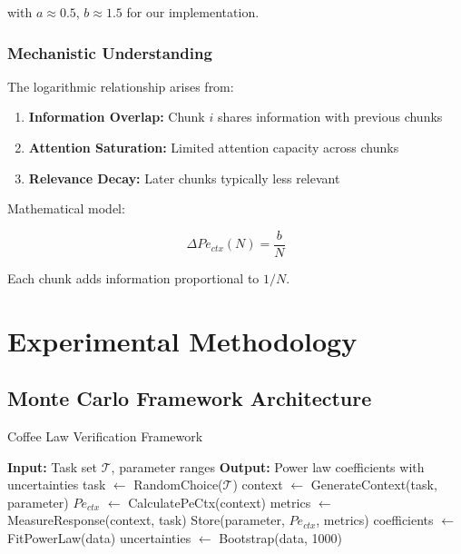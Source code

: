\documentclass[conference]{IEEEtran}
\begin{document}
with $a \approx 0.5$, $b \approx 1.5$ for our implementation.

\subsubsection{Mechanistic Understanding}

The logarithmic relationship arises from:
\begin{enumerate}
\item \textbf{Information Overlap:} Chunk $i$ shares information with previous chunks
\item \textbf{Attention Saturation:} Limited attention capacity across chunks
\item \textbf{Relevance Decay:} Later chunks typically less relevant
\end{enumerate}

Mathematical model:

\begin{equation}
\Delta Pe_{ctx}(N) = \frac{b}{N}
\end{equation}

Each chunk adds information proportional to $1/N$.

\section{Experimental Methodology}

\subsection{Monte Carlo Framework Architecture}

\begin{algorithm}
\caption{Coffee Law Verification Framework}
\begin{algorithmic}
\STATE \textbf{Input:} Task set $\mathcal{T}$, parameter ranges
\STATE \textbf{Output:} Power law coefficients with uncertainties
\STATE
{}
            \STATE task $\leftarrow$ RandomChoice($\mathcal{T}$)
            \STATE context $\leftarrow$ GenerateContext(task, parameter)
            \STATE $Pe_{ctx}$ $\leftarrow$ CalculatePeCtx(context)
            \STATE metrics $\leftarrow$ MeasureResponse(context, task)
            \STATE Store(parameter, $Pe_{ctx}$, metrics)
        \ENDFOR
    \ENDFOR
    \STATE coefficients $\leftarrow$ FitPowerLaw(data)
    \STATE uncertainties $\leftarrow$ Bootstrap(data, 1000)
\ENDFOR
\end{algorithmic}
\end{algorithm}
\end{document}

